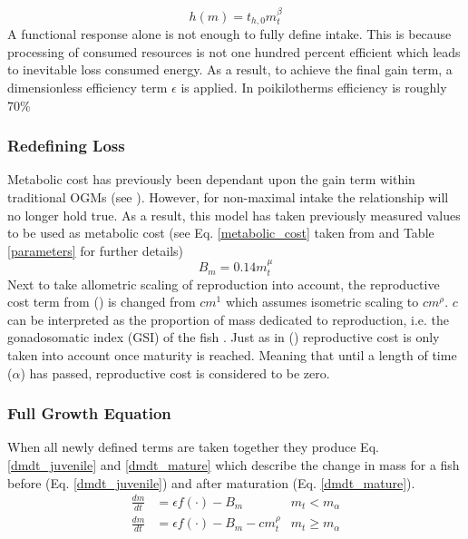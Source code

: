 \documentclass[a4paper, 11pt, hidelinks]{article} %
\begin{document}
	\begin{equation}
		\label{handling_time}
		h(m) = t_{h,0} m_t^\beta
	\end{equation}
	A functional response alone is not enough to fully define intake.  This is because processing of consumed resources is not one hundred percent efficient which leads to inevitable loss consumed energy.  As a result, to achieve the final gain term, a dimensionless efficiency term $\epsilon$ is applied.  In poikilotherms efficiency is roughly 70\% \parencite{Peters1983}
	
	\subsubsection{Redefining Loss}
	Metabolic cost  has previously been dependant upon the gain term within traditional OGMs (see \cite{West2001, Hou2008}).  However, for non-maximal intake the relationship will no longer hold true.  As a result, this model has taken previously measured values to be used as metabolic cost (see Eq. \ref{metabolic_cost} taken from \cite{Peters1983} and Table \ref{parameters} for further details)
	\begin{equation}
		\label{metabolic_cost}
		B_m = 0.14 m_t^\mu
	\end{equation}
	Next to take allometric scaling of reproduction into account, the reproductive cost term from \citeauthor{Charnov2001} (\citeyear{Charnov2001}) is changed from $cm^1$ which assumes isometric scaling to $cm^\rho$.  $c$ can be interpreted as the proportion of mass dedicated to reproduction, i.e. the gonadosomatic index (GSI) of the fish \parencite{Charnov2001}.  Just as in \citeauthor{Charnov2001} (\citeyear{Charnov2001}) reproductive cost is only taken into account once maturity is reached.  Meaning that until a length of time ($\alpha$) has passed, reproductive cost is considered to be zero.
	
	\subsubsection{Full Growth Equation}
	When all newly defined terms are taken together they produce Eq. \ref{dmdt_juvenile}  and \ref{dmdt_mature} which describe the change in mass for a fish before (Eq. \ref{dmdt_juvenile}) and after maturation (Eq. \ref{dmdt_mature}).
	\begin{align}
		\label{dmdt_juvenile}
		\frac{dm}{dt} &= \epsilon f(\cdot) - B_m & m_t < m_\alpha \\
		\label{dmdt_mature}
		\frac{dm}{dt} &= \epsilon f(\cdot) - B_m - cm_t^\rho & m_t \geq m_\alpha
	\end{align}
\end{document}
